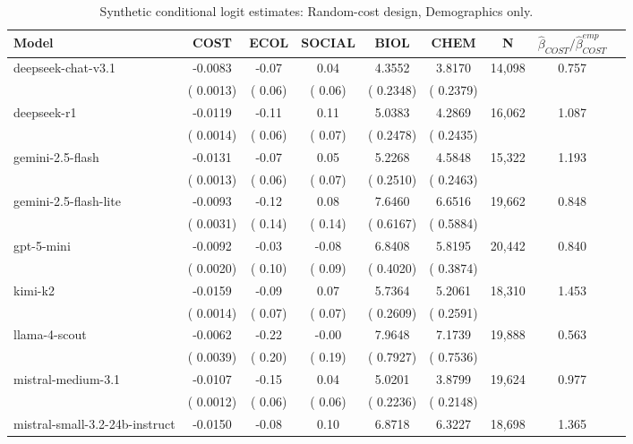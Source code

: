 \begin{table}[h]
\centering
\caption{Synthetic conditional logit estimates: Random-cost design, Demographics only.}
\label{tab:syn-clogit-repeated-withoutBeliefs}
\begin{threeparttable}
\footnotesize
\begin{tabular}{lcccccccr}
\toprule
Model & COST & ECOL & SOCIAL & BIOL & CHEM & N & $\hat\beta_{COST}/\hat\beta_{COST}^{emp}$ \\
\midrule
deepseek-chat-v3.1 &   -0.0083 &     -0.07 &      0.04 &    4.3552 &    3.8170 &    14,098 &  0.757 \\
 & (   0.0013) & (     0.06) & (     0.06) & (   0.2348) & (   0.2379) & & \\
deepseek-r1 &   -0.0119 &     -0.11 &      0.11 &    5.0383 &    4.2869 &    16,062 &  1.087 \\
 & (   0.0014) & (     0.06) & (     0.07) & (   0.2478) & (   0.2435) & & \\
gemini-2.5-flash &   -0.0131 &     -0.07 &      0.05 &    5.2268 &    4.5848 &    15,322 &  1.193 \\
 & (   0.0013) & (     0.06) & (     0.07) & (   0.2510) & (   0.2463) & & \\
gemini-2.5-flash-lite &   -0.0093 &     -0.12 &      0.08 &    7.6460 &    6.6516 &    19,662 &  0.848 \\
 & (   0.0031) & (     0.14) & (     0.14) & (   0.6167) & (   0.5884) & & \\
gpt-5-mini &   -0.0092 &     -0.03 &     -0.08 &    6.8408 &    5.8195 &    20,442 &  0.840 \\
 & (   0.0020) & (     0.10) & (     0.09) & (   0.4020) & (   0.3874) & & \\
kimi-k2 &   -0.0159 &     -0.09 &      0.07 &    5.7364 &    5.2061 &    18,310 &  1.453 \\
 & (   0.0014) & (     0.07) & (     0.07) & (   0.2609) & (   0.2591) & & \\
llama-4-scout &   -0.0062 &     -0.22 &     -0.00 &    7.9648 &    7.1739 &    19,888 &  0.563 \\
 & (   0.0039) & (     0.20) & (     0.19) & (   0.7927) & (   0.7536) & & \\
mistral-medium-3.1 &   -0.0107 &     -0.15 &      0.04 &    5.0201 &    3.8799 &    19,624 &  0.977 \\
 & (   0.0012) & (     0.06) & (     0.06) & (   0.2236) & (   0.2148) & & \\
mistral-small-3.2-24b-instruct &   -0.0150 &     -0.08 &      0.10 &    6.8718 &    6.3227 &    18,698 &  1.365 \\

\end{tabular}
\end{threeparttable}
\end{table}
